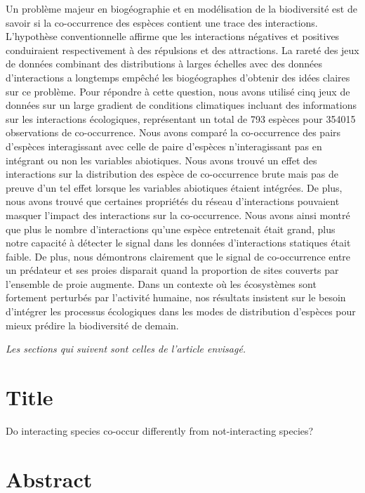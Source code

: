 Un problème majeur en biogéographie et en modélisation de la biodiversité
est de savoir si la co-occurrence des espèces contient une trace des
interactions. L'hypothèse conventionnelle affirme que les interactions
négatives et positives conduiraient respectivement à des répulsions et
des attractions. La rareté des jeux de données combinant des distributions
à larges échelles avec des données d'interactions a longtemps empêché
les biogéographes d'obtenir des idées claires sur ce problème. Pour répondre
à cette question, nous avons utilisé cinq jeux de données sur un large
gradient de conditions climatiques incluant des informations sur les interactions écologiques,
représentant un total de 793 espèces pour 354015 observations de co-occurrence.
Nous avons comparé la co-occurrence des pairs d'espèces interagissant avec
celle de paire d'espèces n'interagissant pas en intégrant ou non les
variables abiotiques. Nous avons trouvé un effet des interactions sur la
distribution des espèce de co-occurrence brute mais pas de preuve d'un tel
effet lorsque les variables abiotiques étaient intégrées. De plus, nous avons
trouvé que certaines propriétés du réseau d'interactions pouvaient masquer l'impact
des interactions sur la co-occurrence. Nous avons ainsi montré que plus le nombre
d'interactions qu'une espèce entretenait était grand, plus notre capacité
à détecter le signal dans les données d'interactions statiques était faible.
De plus, nous démontrons clairement que le signal de co-occurrence entre un
prédateur et ses proies disparait quand la proportion de sites couverts par
l'ensemble de proie augmente. Dans un contexte où les écosystèmes sont
fortement perturbés par l'activité humaine, nos résultats insistent
sur le besoin d'intégrer les processus écologiques dans les
modes de distribution d'espèces pour mieux prédire la biodiversité de demain.






\emph{Les sections qui suivent sont celles de l'article envisagé.}


\newpage
\section{Title}\label{title}

Do interacting species co-occur differently from not-interacting
species?

\section{Abstract}\label{abstract}

